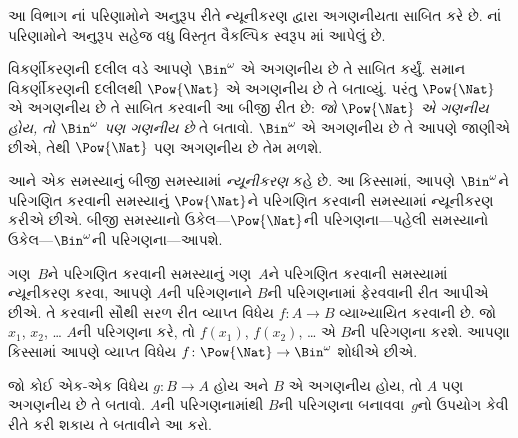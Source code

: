 \begingroup
\makeatletter{}\makeatother


\label{guunit:OLP-0040}


\begin{editorial}
  આ વિભાગ નાં પરિણામોને અનુરૂપ રીતે
  ન્યૂનીકરણ દ્વારા અગણનીયતા સાબિત કરે છે. નાં
  પરિણામોને અનુરૂપ
  સહેજ વધુ વિસ્તૃત વૈકલ્પિક સ્વરૂપ માં આપેલું છે.
\end{editorial}

વિકર્ણીકરણની દલીલ વડે આપણે $\Bin^\omega$ એ અગણનીય
છે તે સાબિત કર્યું. સમાન વિકર્ણીકરણની દલીલથી $\Pow{\Nat}$ એ
અગણનીય છે તે બતાવ્યું. પરંતુ $\Pow{\Nat}$ એ
અગણનીય છે તે સાબિત કરવાની
આ બીજી રીત છે:
\emph{જો $\Pow{\Nat}$ એ ગણનીય હોય, તો $\Bin^\omega$ પણ
ગણનીય છે} તે બતાવો. $\Bin^\omega$ એ અગણનીય
છે તે આપણે જાણીએ છીએ, તેથી $\Pow{\Nat}$ પણ અગણનીય છે તેમ મળશે.

આને એક સમસ્યાનું બીજી સમસ્યામાં \emph{ન્યૂનીકરણ} કહે છે. આ કિસ્સામાં,
આપણે $\Bin^\omega$ને પરિગણિત કરવાની સમસ્યાનું $\Pow{\Nat}$ને
પરિગણિત કરવાની સમસ્યામાં ન્યૂનીકરણ કરીએ છીએ. બીજી સમસ્યાનો
ઉકેલ---$\Pow{\Nat}$ની પરિગણના---પહેલી સમસ્યાનો
ઉકેલ---$\Bin^\omega$ની પરિગણના---આપશે.

ગણ~$B$ને પરિગણિત કરવાની સમસ્યાનું ગણ~$A$ને પરિગણિત કરવાની
સમસ્યામાં ન્યૂનીકરણ કરવા, આપણે $A$ની પરિગણનાને $B$ની પરિગણનામાં
ફેરવવાની રીત આપીએ છીએ. તે કરવાની સૌથી સરળ રીત વ્યાપ્ત વિધેય
$f\colon A \to B$ વ્યાખ્યાયિત કરવાની છે. જો $x_1$, $x_2$, \dots{}
$A$ની પરિગણના કરે, તો $f(x_1)$, $f(x_2)$, \dots{} એ $B$ની
પરિગણના કરશે. આપણા કિસ્સામાં આપણે વ્યાપ્ત વિધેય
$f\colon \Pow{\Nat} \to \Bin^\omega$ શોધીએ છીએ.

\begin{prob}
જો કોઈ એક-એક વિધેય $g\colon B \to A$ હોય અને $B$ એ
અગણનીય હોય, તો $A$ પણ અગણનીય છે તે બતાવો. $A$ની
પરિગણનામાંથી $B$ની પરિગણના બનાવવા~$g$નો ઉપયોગ કેવી રીતે કરી
શકાય તે બતાવીને આ કરો.
\end{prob}

